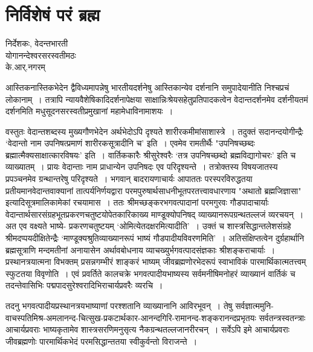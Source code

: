 {\fontsize{15}{17}\selectfont
\presetvalues
\chapter{निर्विशेषं परं ब्रह्म}

\begin{center}
\smallskip

निर्देशकः, वेदन्तभारती\\
योगानन्देश्वरसरस्वतीमठः\\
के.आर्.नगरम्
\addrule
\end{center}

आस्तिकनास्तिकभेदेन द्वैविध्यमापन्नेषु भारतीयदर्शनेषु आस्तिकान्येव दर्शनानि समुपादेयानीति निश्चप्रचं लोकानाम्~। तत्रापि न्यायवैशेषिकादिदर्शनापेक्षया साक्षान्निःश्रेयसहेतुप्रतिपादकत्वेन वेदान्तदर्शनमेव दर्शनीयतमं दर्शनमिति मधुसूदनसरस्वतीप्रमुखानां महामेधाविनामाशयः~। 

वस्तुतः वेदान्तशब्दस्य मुख्यगौणभेदेन अर्थभेदोऽपि दृश्यते शारीरकमीमांसाशास्त्रे~। तदुक्तं सदानन्दयोगीन्द्रैः ‘वेदान्तो नाम उपनिषत्प्रमाणं शारीरकसूत्रादीनि च' इति~। एवमेव रामतीर्थैः "उपनिषच्छब्दः ब्रह्मात्मैक्यसाक्षात्कारविषयः' इति~। वार्तिककारैः श्रीसुरेश्वरैः ‘तत्र उपनिषच्छब्दो ब्रह्मविद्यागोचरः' इति च व्याख्यातम्~। प्रायः वेदान्ताः नाम प्राधान्येन उपनिषदः एव परिदृश्यन्ते~। तत्रोक्तस्य विषयजातस्य प्रपञ्चनमेव ग्रन्थान्तरेषु परिदृश्यते~। भगवान् बादरायणाचार्यः आपाततः परस्परविरुद्धतया प्रतीयमानवेदान्तवाक्यानां तात्पर्यनिर्णयद्वारा परमपुरुषार्थसाधनीभूतपरतत्त्वावधारणाय "अथातो ब्रह्मजिज्ञासा" इत्यादिसूत्रमालिकामेकां  रचयामास~। ततः श्रीमच्छङ्करभगवत्पादानां परमगुरवः गौडपादाचार्याः वेदान्तार्थसारसंग्रहभूतप्रकरणचतुष्टयोपेतकारिकाख्य माण्डूक्योपनिषद् व्याख्यानरूपग्रन्थतल्लजं व्यरचयन्~। अत एव वक्ष्यते भाष्ये- प्रकरणचतुष्टयम् ‘ओमित्येतदक्षरमित्यादीति'~। उक्तं च शास्त्रसिद्धान्तलेशसंग्रहे श्रीमदप्पयदीक्षितेन्द्रैः ‘माण्डूक्यश्रुतिव्याख्यानरूपं भाष्यं गौडपादीयविवरणमिति'~। अतिसंक्षिप्तत्वेन दुर्ग्रहार्थानि ब्रह्मसूत्राणि मन्दमतीनां अनायासेन अर्थावबोधनाय व्याचख्युर्भगवत्पादसंज्ञकाः श्रीशङ्कराचार्याः~। प्रस्थानत्रयात्मना विभक्तम् प्रसन्नगम्भीरं शाङ्करं भाष्यम् जीवब्रह्मणोरभेदरूपं स्वाभाविकं पारमार्थिकात्मतत्त्वम् स्फुटतया विवृणोति~। एवं प्रवर्तिते कालचक्रे भगवत्पादीयभाष्यस्य सर्वमनीषिमनोहरं व्याख्यानं वार्तिकं च तदन्तेवासिभिः पद्मपादसुरेश्वरादिभिराचार्यप्रवरैः व्यरचि~। 

तदनु भगवत्पादीयप्रस्थानत्रयभाष्याणां परश्शतानि व्याख्यानानि आविरभूवन्~। तेषु सर्व\-ज्ञात्ममुनि-वाचस्पतिमिश्र-अमलानन्द-चित्सुख-प्रकटार्थकार-आनन्दगिरि-रामानन्द-\break शङ्करानन्दप्रभृतयः सर्वतन्त्रस्वतन्त्राः आचार्यप्रवराः भाष्यकृतामेव शास्त्रसरणिमनुसृत्य नैकग्रन्थतल्लजानरीरचन्~। सर्वेऽपि इमे आचार्यप्रवराः जीवब्रह्मणोः पारमार्थिकभेदं परमसिद्धान्ततया स्वीकुर्वन्तो विराजन्ते~। 

}
